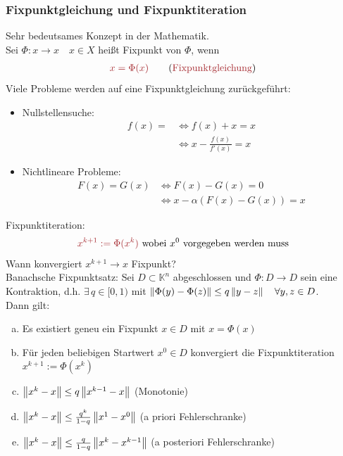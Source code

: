 \subsubsection{Fixpunktgleichung und Fixpunktiteration}
Sehr bedeutsames Konzept in der Mathematik.\\
 Sei $\Phi: x \rightarrow x \quad x \in X$ heißt Fixpunkt von $\Phi$, wenn
\begin{align*}
  \mathbin{\textcolor{rot}{x = \Phi(x)}} \tag{\textcolor{rot}{Fixpunktgleichung}}
\end{align*}
Viele Probleme werden auf eine Fixpunktgleichung zurückgeführt:
\begin{itemize}
  \item Nullstellensuche: \begin{align*}
    f(x) = &\Leftrightarrow f(x) + x = x\\
           &\Leftrightarrow x - \frac{f(x)}{f'(x)} = x
  \end{align*}
  \item Nichtlineare Probleme: \begin{align*}
    F(x) = G(x) &\Leftrightarrow F(x) - G(x) = 0\\
                &\Leftrightarrow x - \alpha \left(F(x) - G(x) \right) = x
  \end{align*}
\end{itemize}
\textcolor{rot}{Fixpunktiteration:}
\begin{align*}
  \mathbin{\textcolor{rot}{x^{k+1} := \Phi(x^k)}} \text{ wobei } x^0 \text{ vorgegeben werden muss}
\end{align*}
Wann konvergiert $x^{k+1} \rightarrow x$ Fixpunkt?\\
Banachsche Fixpunktsatz: Sei $D \subset \mathbb{K}^n$ abgeschlossen und $\Phi: D \rightarrow D$ sein eine Kontraktion, 
d.h. $\exists\, q \in [0,1)$ mit $\left\lVert \Phi(y) - \Phi(z) \right\rVert \leq q\left\lVert y - z \right\rVert \quad \forall y,z \in D$.\\
Dann gilt:
\begin{enumerate}[a)]
  \item Es existiert geneu ein Fixpunkt $x \in D$ mit $x = \Phi(x)$
  \item Für jeden beliebigen Startwert $x^0 \in D$ konvergiert die Fixpunktiteration $x^{k+1} := \Phi(x^k)$
  \item $\left\lVert x^k - x \right\rVert \leq q\left\lVert x^{k-1} - x \right\rVert$ (Monotonie)
  \item $\left\lVert x^k - x \right\rVert \leq \frac{q^k}{1-q} \left\lVert x^1 - x^0 \right\rVert$ (a priori Fehlerschranke)
  \item $\left\lVert x^k - x \right\rVert \leq \frac{q}{1-q} \left\lVert x^k - x^{k-1} \right\rVert$ (a posteriori Fehlerschranke)
\end{enumerate}
